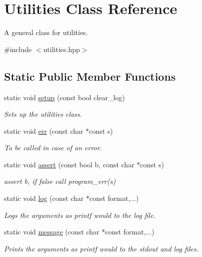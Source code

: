 \hypertarget{class_utilities}{}\section{Utilities Class Reference}
\label{class_utilities}


A general class for utilities.  




{\ttfamily \#include $<$utilities.\+hpp$>$}

\subsection*{Static Public Member Functions}
\begin{DoxyCompactItemize}
\item 
static void \hyperlink{class_utilities_aa448e199bdc43fe62e9b9b989a7f667b}{setup} (const bool clear\+\_\+log)
\begin{DoxyCompactList}\small\item\em Sets up the utilities class. \end{DoxyCompactList}\item 
static void \hyperlink{class_utilities_a5308da50597c93aad2b1ca2ecfbcb723}{err} (const char $\ast$const s)
\begin{DoxyCompactList}\small\item\em To be called in case of an error. \end{DoxyCompactList}\item 
static void \hyperlink{class_utilities_a22c85a2970e168ca0b9ad6fd86752792}{assert} (const bool b, const char $\ast$const s)
\begin{DoxyCompactList}\small\item\em assert b, if false call program\+\_\+err(s) \end{DoxyCompactList}\item 
static void \hyperlink{class_utilities_a7e53321a2a9460f126a476a89b08107b}{log} (const char $\ast$const format,...)
\begin{DoxyCompactList}\small\item\em Logs the arguments as printf would to the log file. \end{DoxyCompactList}\item 
static void \hyperlink{class_utilities_a0e46f2da74b1069eb9df671efed9180d}{message} (const char $\ast$const format,...)
\begin{DoxyCompactList}\small\item\em Prints the arguments as printf would to the stdout and log files. \end{DoxyCompactList}\item 

\end{DoxyCompactItemize}
